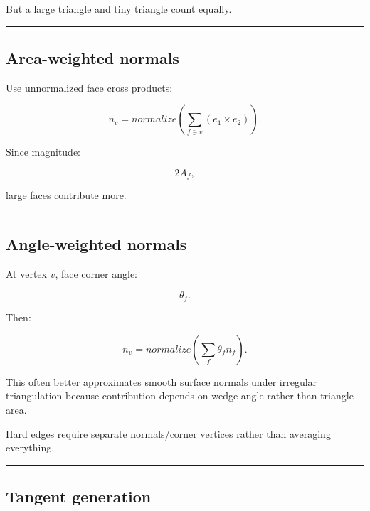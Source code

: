 But a large triangle and tiny triangle count equally.

\begin{center}\rule{0.5\linewidth}{0.5pt}\end{center}

\subsection{Area-weighted normals}\label{04-visual-computing-ii-ch041-area-weighted-normals}

\hypertarget{04-visual-computing-ii-ch041-area-weighted-normals}{}

Use unnormalized face cross products:

\[
\boxed{
n_v
=
normalize
\left(
\sum_{f\ni v}
(e_1\times e_2)
\right).
}
\]

Since magnitude:

\[
2A_f,
\]

large faces contribute more.

\begin{center}\rule{0.5\linewidth}{0.5pt}\end{center}

\subsection{Angle-weighted normals}\label{04-visual-computing-ii-ch041-angle-weighted-normals}

\hypertarget{04-visual-computing-ii-ch041-angle-weighted-normals}{}

At vertex \(v\), face corner angle:

\[
\theta_f.
\]

Then:

\[
\boxed{
n_v=
normalize
\left(
\sum_f
\theta_fn_f
\right).
}
\]

This often better approximates smooth surface normals under irregular triangulation because contribution depends on wedge angle rather than triangle area.

Hard edges require separate normals/corner vertices rather than averaging everything.

\begin{center}\rule{0.5\linewidth}{0.5pt}\end{center}

\subsection{Tangent generation}\label{04-visual-computing-ii-ch041-tangent-generation}

